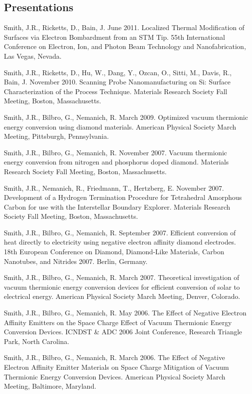 \documentclass[letterpaper,margin,line]{res}
\begin{document}
\begin{resume}
\section{\sc Presentations}
Smith, J.R., Ricketts, D., Bain, J. June 2011. Localized Thermal Modification of Surfaces via Electron Bombardment from an STM Tip. 55th International Conference on Electron, Ion, and Photon Beam Technology and Nanofabrication, Las Vegas, Nevada.

Smith, J.R., Ricketts, D., Hu, W., Dang, Y., Ozcan, O., Sitti, M., Davis, R., Bain, J. November 2010. Scanning Probe Nanomanufacturing on Si: Surface Characterization of the Process Technique. Materials Research Society Fall Meeting, Boston, Massachusetts.

Smith, J.R., Bilbro, G., Nemanich, R. March 2009. Optimized vacuum thermionic energy conversion using diamond materials. American Physical Society March Meeting, Pittsburgh, Pennsylvania.

Smith, J.R., Bilbro, G., Nemanich, R. November 2007. Vacuum thermionic energy conversion from nitrogen and phosphorus doped diamond. Materials Research Society Fall Meeting, Boston, Massachusetts.

Smith, J.R., Nemanich, R., Friedmann, T., Hertzberg, E. November 2007. Development of a Hydrogen Termination Procedure for Tetrahedral Amorphous Carbon for use with the Interstellar Boundary Explorer. Materials Research Society Fall Meeting, Boston, Massachusetts.

Smith, J.R., Bilbro, G., Nemanich, R. September 2007. Efficient conversion of heat directly to electricity using negative electron affinity diamond electrodes. 18th European Conference on Diamond, Diamond-Like Materials, Carbon Nanotubes, and Nitrides 2007. Berlin, Germany.

Smith, J.R., Bilbro, G., Nemanich, R. March 2007. Theoretical investigation of vacuum thermionic energy conversion devices for efficient conversion of solar to electrical energy. American Physical Society March Meeting, Denver, Colorado.

Smith, J.R., Bilbro, G., Nemanich, R. May 2006. The Effect of Negative Electron Affinity Emitters on the Space Charge Effect of Vacuum Thermionic Energy Conversion Devices. ICNDST \& ADC 2006 Joint Conference, Research Triangle Park, North Carolina.

Smith, J.R., Bilbro, G., Nemanich, R. March 2006. The Effect of Negative Electron Affinity Emitter Materials on Space Charge Mitigation of Vacuum Thermionic Energy Conversion Devices. American Physical Society March Meeting, Baltimore, Maryland.


\end{resume}
\end{document}
